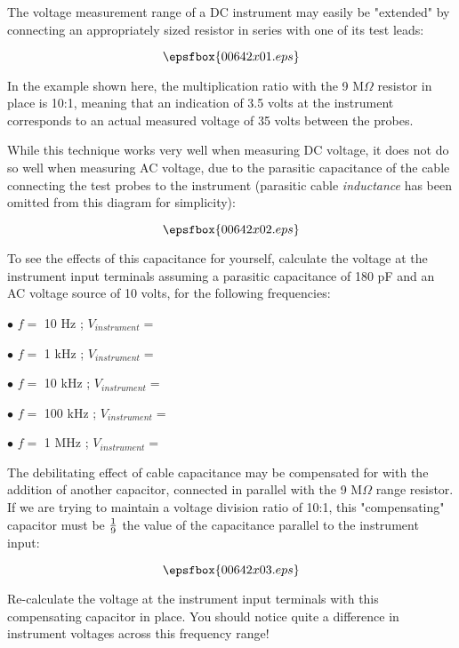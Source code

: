 

The voltage measurement range of a DC instrument may easily be "extended" by connecting an appropriately sized resistor in series with one of its test leads:

$$\epsfbox{00642x01.eps}$$

In the example shown here, the multiplication ratio with the 9 M$\Omega$ resistor in place is 10:1, meaning that an indication of 3.5 volts at the instrument corresponds to an actual measured voltage of 35 volts between the probes.

While this technique works very well when measuring DC voltage, it does not do so well when measuring AC voltage, due to the parasitic capacitance of the cable connecting the test probes to the instrument (parasitic cable {\it inductance} has been omitted from this diagram for simplicity):

$$\epsfbox{00642x02.eps}$$

To see the effects of this capacitance for yourself, calculate the voltage at the instrument input terminals assuming a parasitic capacitance of 180 pF and an AC voltage source of 10 volts, for the following frequencies:

\medskip
\item{$\bullet$} $f =$ 10 Hz ; $V_{instrument} =$
\item{$\bullet$} $f =$ 1 kHz ; $V_{instrument} =$
\item{$\bullet$} $f =$ 10 kHz ; $V_{instrument} =$
\item{$\bullet$} $f =$ 100 kHz ; $V_{instrument} =$
\item{$\bullet$} $f =$ 1 MHz ; $V_{instrument} =$
\medskip

The debilitating effect of cable capacitance may be compensated for with the addition of another capacitor, connected in parallel with the 9 M$\Omega$ range resistor.  If we are trying to maintain a voltage division ratio of 10:1, this "compensating" capacitor must be ${1 \over 9}$ the value of the capacitance parallel to the instrument input:

$$\epsfbox{00642x03.eps}$$

Re-calculate the voltage at the instrument input terminals with this compensating capacitor in place.  You should notice quite a difference in instrument voltages across this frequency range!

